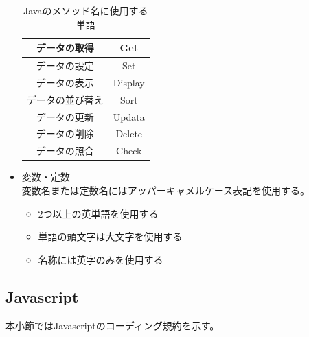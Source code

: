 \documentclass[a4j]{jarticle}
\begin{document}
\begin{itemize}
				\begin{table}[H]
			\caption{Javaのメソッド名に使用する単語}
			\label{tab:o2}
			\begin{center}
			\begin{tabular}{|c|c|}
			\hline
			データの取得 & Get\\\hline
			データの設定 & Set\\\hline
			データの表示 & Display\\\hline
			データの並び替え & Sort\\\hline
			データの更新  & Updata\\\hline
			データの削除  & Delete\\\hline
			データの照合 & Check\\\hline
			\end{tabular}
			\end{center}
			\end{table}
	\item 変数・定数\\
		変数名または定数名にはアッパーキャメルケース表記を使用する。
	\begin{itemize}
		\item 2つ以上の英単語を使用する
		\item 単語の頭文字は大文字を使用する
		\item 名称には英字のみを使用する
	\end{itemize}


\end{itemize}
\subsection{Javascript}

本小節ではJavascriptのコーディング規約を示す。
\end{document}
